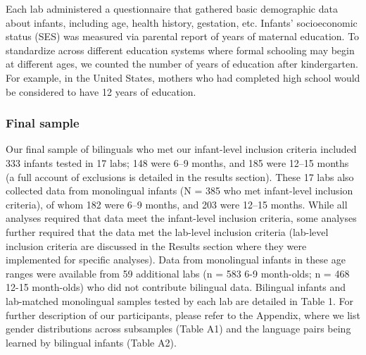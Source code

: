 \documentclass[,man,floatsintext]{apa6}
\begin{document}
Each lab administered a questionnaire that gathered basic demographic data about infants, including age, health history, gestation, etc. Infants' socioeconomic status (SES) was measured via parental report of years of maternal education. To standardize across different education systems where formal schooling may begin at different ages, we counted the number of years of education after kindergarten. For example, in the United States, mothers who had completed high school would be considered to have 12 years of education.

\hypertarget{final-sample}{%
\subsubsection{Final sample}\label{final-sample}}

Our final sample of bilinguals who met our infant-level inclusion criteria included 333 infants tested in 17 labs; 148 were 6--9 months, and 185 were 12--15 months (a full account of exclusions is detailed in the results section). These 17 labs also collected data from monolingual infants (N = 385 who met infant-level inclusion criteria), of whom 182 were 6--9 months, and 203 were 12--15 months. While all analyses required that data meet the infant-level inclusion criteria, some analyses further required that the data met the lab-level inclusion criteria (lab-level inclusion criteria are discussed in the Results section where they were implemented for specific analyses). Data from monolingual infants in these age ranges were available from 59 additional labs (n = 583 6-9 month-olds; n = 468 12-15 month-olds) who did not contribute bilingual data. Bilingual infants and lab-matched monolingual samples tested by each lab are detailed in Table 1. For further description of our participants, please refer to the Appendix, where we list gender distributions across subsamples (Table A1) and the language pairs being learned by bilingual infants (Table A2).
\end{document}
